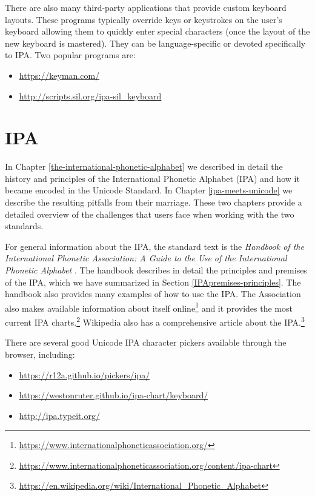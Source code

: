 There are also many third-party applications that provide custom keyboard layouts. These programs typically override keys or keystrokes on the user's keyboard allowing them to quickly enter special characters (once the layout of the new keyboard is mastered). They can be language-specific or devoted specifically to IPA. Two popular programs are:

\begin{itemize}
	\item \url{https://keyman.com/}
	\item \url{http://scripts.sil.org/ipa-sil_keyboard}
\end{itemize}


\section{IPA}
In Chapter \ref{the-international-phonetic-alphabet} we described in detail the history and principles of the International Phonetic Alphabet (IPA) and how it became encoded in the Unicode Standard. In Chapter \ref{ipa-meets-unicode} we describe the resulting pitfalls from their marriage. These two chapters provide a detailed overview of the challenges that users face when working with the two standards.

For general information about the IPA, the standard text is the \textit{Handbook of the International Phonetic Association: A Guide to the Use of the International Phonetic Alphabet} \citep{IPA1999}. The handbook describes in detail the principles and premises of the IPA, which we have summarized in Section \ref{IPApremises-principles}. The handbook also provides many examples of how to use the IPA. The Association also makes available information about itself online\footnote{\url{https://www.internationalphoneticassociation.org/}} and it provides the most current IPA charts.\footnote{\url{https://www.internationalphoneticassociation.org/content/ipa-chart}} Wikipedia also has a comprehensive article about the IPA.\footnote{\url{https://en.wikipedia.org/wiki/International_Phonetic_Alphabet}}

There are several good Unicode IPA character pickers available through the browser, including:

\begin{itemize}
	\item \url{https://r12a.github.io/pickers/ipa/}
	\item \url{https://westonruter.github.io/ipa-chart/keyboard/}
	\item \url{http://ipa.typeit.org/}
\end{itemize}


